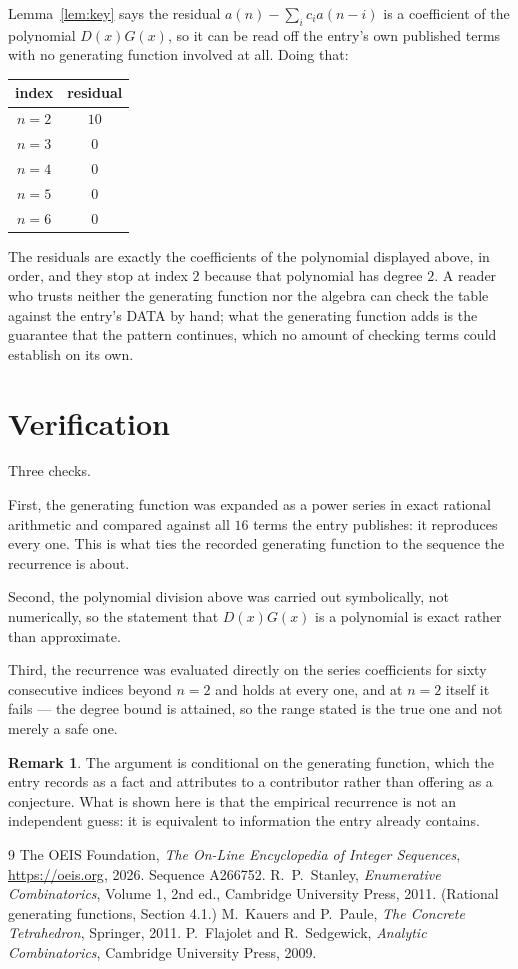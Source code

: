 \documentclass[11pt,a4paper]{article}
\theoremstyle{plain}
\theoremstyle{definition}
\newtheorem{remark}[theorem]{Remark}
\begin{document}
Lemma~\ref{lem:key} says the residual $a(n)-\sum_ic_ia(n-i)$ is a coefficient of the
polynomial $D(x)G(x)$, so it can be read off the entry's own published terms with no
generating function involved at all. Doing that:
\begin{center}
\begin{tabular}{cc}
index & residual \\ \hline
$n=2$ & $10$ \\
$n=3$ & $0$ \\
$n=4$ & $0$ \\
$n=5$ & $0$ \\
$n=6$ & $0$
\end{tabular}
\end{center}
The residuals are exactly the coefficients of the polynomial displayed above, in order, and
they stop at index $2$ because that polynomial has degree $2$. A reader who trusts
neither the generating function nor the algebra can check the table against the entry's DATA
by hand; what the generating function adds is the guarantee that the pattern continues, which
no amount of checking terms could establish on its own.

\section{Verification}

Three checks.

First, the generating function was expanded as a power series in exact rational arithmetic and
compared against all $16$ terms the entry publishes: it reproduces every one. This is
what ties the recorded generating function to the sequence the recurrence is about.

Second, the polynomial division above was carried out symbolically, not numerically, so the
statement that $D(x)G(x)$ is a polynomial is exact rather than approximate.

Third, the recurrence was evaluated directly on the series coefficients for sixty consecutive
indices beyond $n=2$ and holds at every one, and at $n=2$ itself it fails --- the
degree bound is attained, so the range stated is the true one and not merely a safe one.

\begin{remark}
The argument is conditional on the generating function, which the entry records as a fact and
attributes to a contributor rather than offering as a conjecture. What is shown here is that
the empirical recurrence is not an independent guess: it is equivalent to information the
entry already contains.
\end{remark}

\begin{thebibliography}{9}
 The OEIS Foundation, \emph{The On-Line Encyclopedia of Integer
Sequences}, \url{https://oeis.org}, 2026. Sequence A266752.
 R.~P.~Stanley, \emph{Enumerative Combinatorics}, Volume 1, 2nd ed.,
Cambridge University Press, 2011. (Rational generating functions, Section 4.1.)
 M.~Kauers and P.~Paule, \emph{The Concrete Tetrahedron}, Springer, 2011.
 P.~Flajolet and R.~Sedgewick, \emph{Analytic Combinatorics}, Cambridge
University Press, 2009.
\end{thebibliography}
\end{document}

